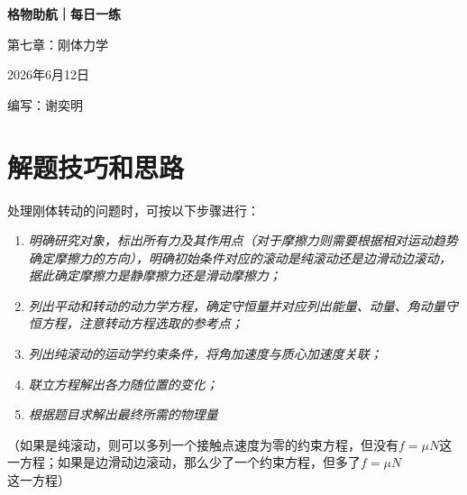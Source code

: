 \documentclass[11pt,a4paper]{ctexart}
\begin{document}
\begin{center}
  {\Large\bfseries\color{mainblue} 格物助航｜每日一练}\par
  \vspace{0.25em}
  {\large 第七章：刚体力学}\par
  \vspace{0.35em}
  {\small 2026年6月12日}\par
  \vspace{0.35em}
  {\small 编写：谢奕明}
\end{center}

\vspace{-0.3em}

\section*{解题技巧和思路}
\begin{tipBox}
处理刚体转动的问题时，可按以下步骤进行：
\begin{enumerate}
\item \textit{明确研究对象，标出所有力及其作用点（对于摩擦力则需要根据相对运动趋势确定摩擦力的方向），明确初始条件对应的滚动是纯滚动还是边滑动边滚动，据此确定摩擦力是静摩擦力还是滑动摩擦力；}
\item \textit{列出平动和转动的动力学方程，确定守恒量并对应列出能量、动量、角动量守恒方程，注意转动方程选取的参考点；}
\item \textit{列出纯滚动的运动学约束条件，将角加速度与质心加速度关联；}
\item \textit{联立方程解出各力随位置的变化；}
\item \textit{根据题目求解出最终所需的物理量}
\end{enumerate}
（如果是纯滚动，则可以多列一个接触点速度为零的约束方程，但没有$f  = \mu N$这一方程；如果是边滑动边滚动，那么少了一个约束方程，但多了$f = \mu N$这一方程）
\end{tipBox}
\end{document}

